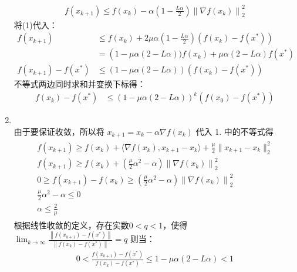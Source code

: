 \documentclass[11pt,letter,notitlepage]{article}
\begin{document}
\begin{solution}
\begin{enumerate}
\begin{align*}
            f\left(x_{k+1}\right) \leqslant f\left(x_{k}\right)-\alpha\left(1-\frac{L \alpha}{2}\right)\left\|\nabla f\left(x_{k}\right)\right\|_{2}^{2}
        \end{align*}
        将(1)代入：
        \begin{align*}
           f(x_{k+1}) & \leqslant f\left(x_{k}\right)+2 \mu \alpha \left(1-\frac{L \alpha}{2}\right)\left(f\left(x_{k}\right)-f\left(x^{*}\right)\right) \\ &=\left(1-\mu \alpha (2-L \alpha )) f\left(x_{k}\right)+\mu \alpha (2-L \alpha) f\left(x^{*}\right)\right.\\
           f\left(x_{k+1}\right)-f\left(x^{*}\right) & \leqslant\left(1-\mu \alpha(2-L \alpha )\right)\left(f\left(x_{k}\right)-f\left(x^{*}\right)\right)
        \end{align*}
        不等式两边同时求和并变换下标得：
        \begin{align*}
            f\left(x_{k}\right)-f\left(x^{*}\right) & \leqslant(1-\mu \alpha(2-L\alpha ))^{k}\left(f\left(x_{0}\right)-f\left(x^{*}\right)\right)
        \end{align*}
        \item \ \\
        由于要保证收敛，所以将 $x_{k+1} = x_{k} - \alpha \nabla f(x_k)$ 代入 1. 中的不等式得
        \begin{align*}
        \begin{array}{c}{f\left(x_{k+1}\right) \geqslant f\left(x_{k}\right)+\langle \nabla f\left(x_{k}\right), x_{k+1}-x_{k}\rangle+\frac{\mu}{2} \| x_{k+1} -x_k }\|_2^2 \\ {f\left(x_{k+1}\right) \geqslant f\left(x_{k}\right)+\left(\frac{\mu}{2} \alpha^{2}-\alpha\right)\left\|\nabla f\left(x_{k}\right)\right\|_{2}^{2}}\\{0\geqslant f\left(x_{k+1}\right) - f(x_k) \geqslant \left(\frac{\mu}{2} \alpha^{2}-\alpha\right)\left\|\nabla f\left(x_{k}\right)\right\|_{2}^{2}} \\ {\frac{\mu}{2} \alpha^{2}-\alpha \leqslant 0} \\ {\alpha \leqslant \frac{2}{\mu}}\end{array}
        \end{align*}
        根据线性收敛的定义，存在实数$0 < q < 1$，使得$\lim _{k \rightarrow \infty} \frac{\left\|f(x_{k+1})-f(x^{*})\right\|}{\left\|f(x_{k})-f(x^{*})\right\|}=q$ 则当：\\
        \begin{align*} 
            0<\frac{f\left(x_{k+1}\right)-f\left(x^{*}\right)}{f\left(x_{k}\right)-f\left(x^{*}\right)} \leqslant 1-\mu \alpha(2-L \alpha) < 1

\end{align*}
\end{enumerate}
\end{solution}
\end{document}
